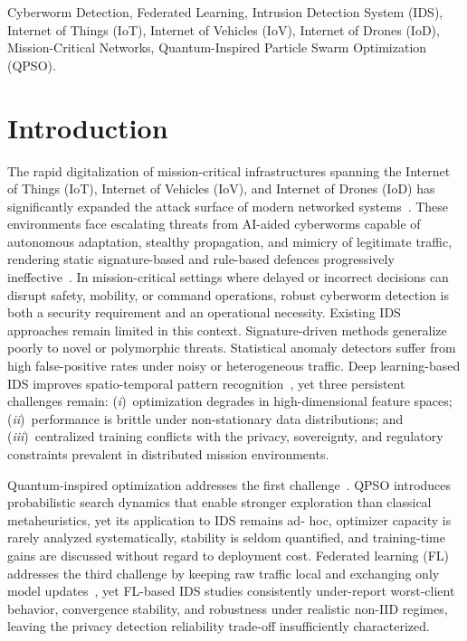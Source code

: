 \documentclass[conference]{IEEEtran}
\begin{document}
\begin{IEEEkeywords}
Cyberworm Detection, Federated Learning, Intrusion Detection System (IDS), Internet of Things (IoT), Internet of Vehicles (IoV), Internet of Drones (IoD), Mission-Critical Networks, Quantum-Inspired Particle Swarm Optimization (QPSO).  
\end{IEEEkeywords}


\section{Introduction}
\label{sec:introduction}
The rapid digitalization of mission-critical infrastructures spanning
the Internet of Things (IoT), Internet of Vehicles (IoV), and Internet
of Drones (IoD) has significantly expanded the attack surface of modern networked systems~\cite{dritsas, ajakwe2024facets}. These environments face
escalating threats from AI-aided cyberworms capable of autonomous adaptation, stealthy propagation, and mimicry of legitimate traffic, rendering static signature-based and rule-based defences progressively
ineffective~\cite{khezri}. In mission-critical settings where delayed or incorrect decisions can disrupt safety, mobility, or command operations, robust cyberworm detection is both a security requirement
and an operational necessity.
Existing IDS approaches remain limited in this context. Signature-driven methods generalize poorly to novel or polymorphic threats. Statistical
anomaly detectors suffer from high false-positive rates under noisy or heterogeneous traffic. Deep learning-based IDS improves spatio-temporal pattern recognition~\cite{al202}, yet three persistent challenges remain: (\textit{i})~optimization degrades in high-dimensional feature spaces; (\textit{ii})~performance is brittle under non-stationary data distributions; and (\textit{iii})~centralized training conflicts
with the privacy, sovereignty, and regulatory constraints prevalent in distributed mission environments.

Quantum-inspired optimization addresses the first
challenge~\cite{ajakwe2025eqai,vivekquantum}. QPSO introduces probabilistic search dynamics that enable stronger exploration than classical metaheuristics, yet its application to IDS remains ad- hoc, optimizer capacity is rarely analyzed systematically, stability is seldom quantified, and training-time gains are discussed without regard to deployment cost. Federated learning (FL) addresses the third challenge by keeping raw traffic local and exchanging only model updates~\cite{hamadsystematic}, yet FL-based IDS studies consistently under-report worst-client behavior, convergence stability, and robustness under realistic non-IID regimes, leaving the privacy detection reliability trade-off insufficiently characterized.
\end{document}
